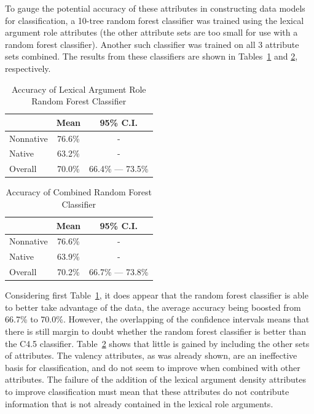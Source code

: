 \documentclass[main.tex]{subfiles}
\begin{document}
To gauge the potential accuracy of these attributes in constructing data models for classification, a 10-tree random forest classifier was trained using the lexical argument role attributes (the other attribute sets are too small for use with a random forest classifier). Another such classifier was trained on all 3 attribute sets combined. The results from these classifiers are shown in Tables~\ref{table:lex-role-rf-results} and \ref{table:combined-rf-results}, respectively.
\begin{table}[htbp]
\centering
\caption{Accuracy of Lexical Argument Role Random Forest Classifier}
\begin{tabular}{l c c}
\toprule
& Mean & 95\% C.I.\\
\midrule
Nonnative & 76.6\% & - \\
Native & 63.2\% & - \\
Overall & 70.0\% & 66.4\% --- 73.5\% \\
\bottomrule
\end{tabular}
\label{table:lex-role-rf-results}
\end{table}
\begin{table}[htbp]
\centering
\caption{Accuracy of Combined Random Forest Classifier}
\begin{tabular}{l c c}
\toprule
& Mean & 95\% C.I.\\
\midrule
Nonnative & 76.6\% & - \\
Native & 63.9\% & - \\
Overall & 70.2\% & 66.7\% --- 73.8\% \\
\bottomrule
\end{tabular}
\label{table:combined-rf-results}
\end{table}
Considering first Table~\ref{table:lex-role-rf-results}, it does appear that the random forest classifier is able to better take advantage of the data, the average accuracy being boosted from 66.7\% to 70.0\%. However, the overlapping of the confidence intervals means that there is still margin to doubt whether the random forest classifier is better than the C4.5 classifier. Table~\ref{table:combined-rf-results} shows that little is gained by including the other sets of attributes. The valency attributes, as was already shown, are an ineffective basis for classification, and do not seem to improve when combined with other attributes. The failure of the addition of the lexical argument density attributes to improve classification must mean that these attributes do not contribute information that is not already contained in the lexical role arguments.
\newpage
\biblio
\end{document}
